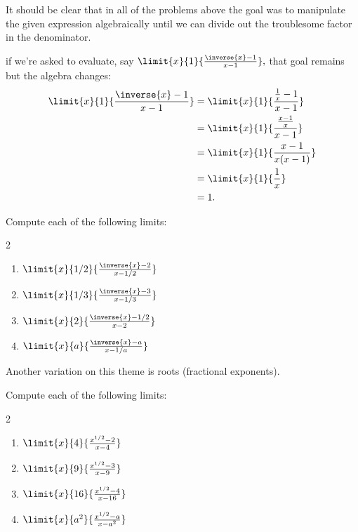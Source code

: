 \begin{ProblemSection}
    It should be clear that  in all of the problems above the goal
    was to manipulate the given expression algebraically until we can
    divide out the troublesome factor in the denominator.

    if we're asked to evaluate, say
    $\limit{x}{1}{\frac{\inverse{x}-1}{x-1}},$ that goal remains but
    the algebra changes:
    \begin{align*}
      \limit{x}{1}{\frac{\inverse{x}-1}{x-1}} &=
                                                \limit{x}{1}{\frac{\frac1x-1}{x-1}} \\
                                              &=
                                                \limit{x}{1}{\frac{\frac{x-1}{x}}{x-1}} \\
                                              &=\limit{x}{1}{\frac{x-1}
                                                {x(x-1)}} \\
      &=\limit{x}{1}{\frac1x} \\
      &=1.
    \end{align*}
    \begin{embeddedproblem}{}
      Compute each of the following limits:
      \begin{multicols}{2}
        \begin{enumerate}[label={\bf{}(\alph*)}]
          \item $\limit{x}{1/2}{\frac{\inverse{x}-2}{x-1/2}}$
          \item $\limit{x}{1/3}{\frac{\inverse{x}-3}{x-1/3}}$
          \item $\limit{x}{2}{\frac{\inverse{x}-1/2}{x-2}}$
          \item $\limit{x}{a}{\frac{\inverse{x}-a}{x-1/a}}$
          \end{enumerate}
        \end{multicols}
      \end{embeddedproblem}

      Another variation on this theme is roots (fractional exponents).

      \begin{embeddedproblem}{}
      Compute each of the following limits:
      \begin{multicols}{2}
        \begin{enumerate}[label={\bf{}(\alph*)}]
          \item $\limit{x}{4}{\frac{x^{1/2}-2}{x-4}}$
          \item $\limit{x}{9}{\frac{x^{1/2}-3}{x-9}}$
          \item $\limit{x}{16}{\frac{x^{1/2}-4}{x-16}}$
          \item $\limit{x}{a^2}{\frac{x^{1/2}-a}{x-a^2}}$
          \end{enumerate}          
        \end{multicols}
      \end{embeddedproblem}
    \end{ProblemSection}

